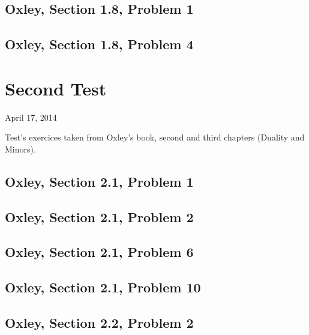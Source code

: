     \section{Oxley, Section 1.8, Problem 1}
        
        \clearpage

    \section{Oxley, Section 1.8, Problem 4}
        
        \clearpage

\chapter{Second Test}
    \begin{center} April 17, 2014 \end{center}  
     Test's exercices taken from Oxley's book, second and third chapters (Duality and Minors). 

    
    \section{Oxley, Section 2.1, Problem 1}
        
        \clearpage

    \section{Oxley, Section 2.1, Problem 2}
        
        \clearpage

    \section{Oxley, Section 2.1, Problem 6}
        
        \clearpage

    \section{Oxley, Section 2.1, Problem 10}
        
        \clearpage

    \section{Oxley, Section 2.2, Problem 2}
        
        \clearpage

